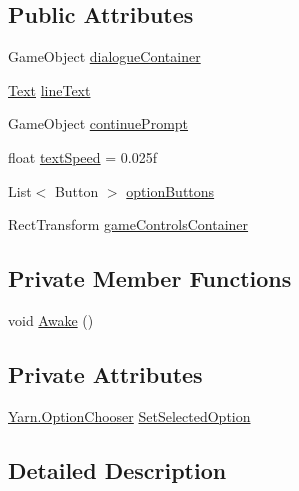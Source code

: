 \subsection*{Public Attributes}
\begin{DoxyCompactItemize}
\item 
Game\-Object \hyperlink{a00053_a2eaebc844d2ca982ec078708d070dbd3}{dialogue\-Container}
\item 
\hyperlink{a00040_a301aa7c866593a5b625a8fc158bbeacea9dffbf69ffba8bc38bc4e01abf4b1675}{Text} \hyperlink{a00053_a791f15a67a97fbe06ffc0bdf518edd04}{line\-Text}
\item 
Game\-Object \hyperlink{a00053_a74367b77a6a5218fa47dbe1d6266e4c6}{continue\-Prompt}
\item 
float \hyperlink{a00053_a6053aa65534195d626031413ef3a0828}{text\-Speed} = 0.\-025f
\item 
List$<$ Button $>$ \hyperlink{a00053_a090b7693e7ec6ec43c8c8e2b6b20b015}{option\-Buttons}
\item 
Rect\-Transform \hyperlink{a00053_a8344106eb22a0ad00e2400c2941b3e5f}{game\-Controls\-Container}
\end{DoxyCompactItemize}
\subsection*{Private Member Functions}
\begin{DoxyCompactItemize}
\item 
void \hyperlink{a00053_a6e57983db349b0d9e4526ecb7aa6fed2}{Awake} ()
\end{DoxyCompactItemize}
\subsection*{Private Attributes}
\begin{DoxyCompactItemize}
\item 
\hyperlink{a00040_a39866cbb03c03a35805d598b5d4ad553}{Yarn.\-Option\-Chooser} \hyperlink{a00053_a558f60ef9a7bcf887f015ba0d27aa6ef}{Set\-Selected\-Option}
\end{DoxyCompactItemize}


\subsection{Detailed Description}


